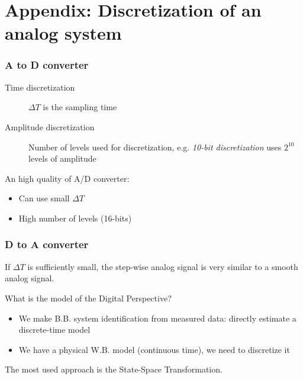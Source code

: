 \chapter{Appendix: Discretization of an analog system}


\subsection*{A to D converter}


\begin{description}
    \item[Time discretization] $\Delta T$ is the sampling time
    \item[Amplitude discretization] Number of levels used for discretization, e.g. \emph{10-bit discretization} uses $2^{10}$ levels of amplitude
\end{description}

An high quality of A/D converter:
\begin{itemize}
    \item Can use small $\Delta T$
    \item High number of levels (16-bits)
\end{itemize}


\subsection*{D to A converter}


If $\Delta T$ is sufficiently small, the step-wise analog signal is very similar to a smooth analog signal.


What is the model of the Digital Perspective?


\begin{itemize}
    \item We make B.B. system identification from measured data: directly estimate a discrete-time model
    \item We have a physical W.B. model (continuous time), we need to discretize it
\end{itemize}

The most used approach is the State-Space Transformation.

